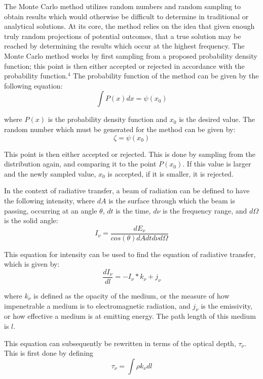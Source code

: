 \documentclass[a4paper, 10pt]{article}
\begin{document}
The Monte Carlo method utilizes random numbers and random sampling to obtain results which would otherwise be difficult to determine in traditional or analytical solutions. At its core, the method relies on the idea that given enough truly random projections of potential outcomes, that a true solution may be reached by determining the results which occur at the highest frequency. The Monte Carlo method works by first sampling from a proposed probability density function; this point is then either accepted or rejected in accordance with the probability function.$^4$ The probability function of the method can be given by the following equation:
\begin{equation}
\int P(x)dx= \psi (x_0)
\end{equation}

 \noindent where $P(x)$ is the probability density function and $x_0$ is the desired value. The random number which must be generated for the method can be given by:
\begin{equation}
\zeta=\psi (x_0)
\end{equation}

 \noindent This point is then either accepted or rejected. This is done by sampling from the distribution again, and comparing it to the point $P(x_0)$. If this value is larger and the newly sampled value, $x_0$ is accepted, if it is smaller, it is rejected. 

In the context of radiative transfer, a beam of radiation can be defined to have the following intensity, where $dA$ is the surface through which the beam is passing, occurring at an angle $\theta$, $dt$ is the time, $d\nu$ is the frequency range, and $d\Omega$ is the solid angle:
\begin{equation}
I_\nu=\frac{dE_\nu}{cos(\theta) dA dt d\nu d\Omega}
\end{equation}

\noindent This equation for intensity can be used to find the equation of radiative transfer, which is given by: 
\begin{equation}
\frac{dI_\nu}{dl}=-I_\nu*k_\nu + j_\nu
\end{equation}

\noindent where $k_\nu$ is defined as the opacity of the medium, or the measure of how impenetrable a medium is to electromagnetic radiation, and $j_\nu$ is the emissivity, or how effective a medium is at emitting energy. The path length of this medium is $l$. 

This equation can subsequently be rewritten in terms of the optical depth, $\tau_\nu$. This is first done by defining 
\begin{equation}
\tau_\nu=\int \rho k_\nu dl
\end{equation}
\end{document}

